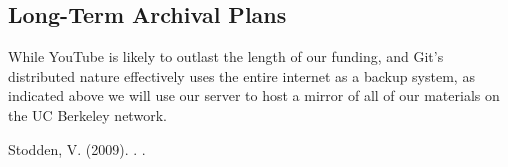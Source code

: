 \documentclass[11pt]{article}
\begin{document}
\subsection*{Long-Term Archival Plans}

While YouTube is likely to outlast the length of our funding, and Git's
distributed nature effectively uses the entire internet as a backup
system, as indicated above we will use our server to host a mirror
of all of our materials on the UC Berkeley network.

\begin{thebibliography}{99}

Stodden, V. (2009).
.
.

\end{thebibliography}
\end{document}
